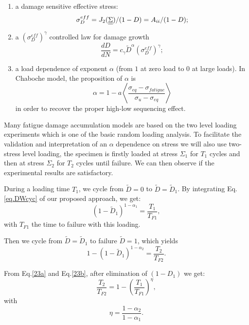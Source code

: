 \begin{enumerate} 
\vspace{6pt}
\item a damage sensitive effective stress: 
$$\sigma_D^{eff} = J_2(\uline{\uline{\Sigma}})/(1-D)={A}_{\uppercase\expandafter{\romannumeral2}}/(1-D);$$

\vspace{6pt}

\item a $(\sigma_D^{eff})^\gamma$ controlled  law for damage growth
$$\dfrac{dD}{dN} =c_\gamma {\tilde{D}}^\alpha (\sigma_D^{eff})^\gamma;$$

\vspace{6pt}

\item  a load dependence of exponent $\alpha$ (from $1$ at zero load to $0$ at large loads). In Chaboche model, the proposition of $\alpha$ is
\begin{equation}
\alpha = 1 - a\left\langle \frac{ \sigma_{eq}-\sigma_{fatigue}}{ \sigma_{u} - \sigma_{eq}}\right\rangle
\label{eq.alpchaboche}
\end{equation}
in order to recover the proper high-low sequencing effect.
\end{enumerate}

Many fatigue damage accumulation models are based on the two level loading experiments which is one of the basic random loading analysis. To facilitate the validation and interpretation of an $\alpha$ dependence on stress we will also use two-stress level loading, the specimen is firstly loaded at stress $\Sigma_1$ for $T_1$ cycles and then at stress $\Sigma_2$ for $T_2$ cycles until failure. We can then observe if the experimental results are satisfactory.

During a loading time $T_1$, we  cycle  from $\tilde{D}=0$ to $\tilde{D}= \tilde{D}_1$. By integrating Eq.\eqref{eq.DWcyc} of our proposed approach, we get:
\begin{equation}
\left( 1-\tilde{D}_1\right) ^{1-\alpha_1}=\dfrac{T_1}{T_{F1}},
\label{23a}
\end{equation}
with $T_{F1}$ the time to failure with this loading.

Then we cycle from  ${\tilde D}={\tilde D}_1$ to failure ${\tilde D}=1$, which yields
\begin{equation}
1-\left( 1-\tilde{D}_1\right)^{1-\alpha_2}=\dfrac{T_2}{T_{F2}}.
\label{23b}
\end{equation}

From Eq.\eqref{23a} and Eq.\eqref{23b}, after elimination of $\left( 1-D_1\right)$ we get:
\begin{equation} 
\dfrac{T_2}{T_{F2}} =1-\left( \dfrac{T_1}{T_{F1}}\right) ^\eta,
\label{eq.sequence}
\end{equation}
with
\begin{equation}
\eta=\dfrac{1-\alpha_2}{1-\alpha_1}.
\label{eq.eta}
\end{equation}

